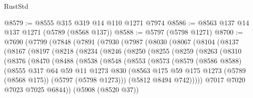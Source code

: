 \begin{lexlean}{RustStd}
\begin{coremodule}
@8579 := @8555 @315 @319 @14 @110 @1271 @7974
@8586 := @8563 @137 @14 @137 @1271 (@5789 (@8568 @137))
@8588 := @5797 (@5798 @1271)
@8700 := @7690
    (@7799
      (@7848
        (@7891
          (@7930
            (@7987
              (@8030
                (@8067
                  (@8104
                    (@8137
                      (@8167
                        (@8197
                          (@8218
                            (@8234
                              (@8246
                                (@8250
                                  (@8255
                                    (@8259
                                      (@8263
                                        (@8310
                                          (@8376
                                            (@8470
                                              (@8488
                                                (@8538
                                                  (@8548
                                                    (@8553
                                                      (@8573
                                                        (@8579
                                                          (@8586 @8588)
                                                          (@8555
                                                            @317
                                                            @64
                                                            @59
                                                            @11
                                                            @1273
                                                            @830
                                                            (@8563
                                                              @175
                                                              @59
                                                              @175
                                                              @1273
                                                              (@5789 (@8568 @175))
                                                              (@5797 (@5798 @1273)))
                                                            (@5812 @8494 @742)))))
                                                    @7017
                                                    @7020
                                                    @7023
                                                    @7025
                                                    @6844))
                                                (@5908 (@8520 @37))

\end{coremodule}
\end{lexlean}

